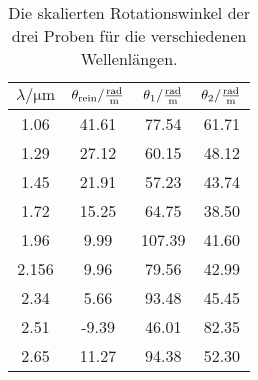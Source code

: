 \begin{table} \caption{Die skalierten Rotationswinkel der drei Proben für die verschiedenen Wellenlängen.}
    \label{tab:skaliert}
    \centering
    \begin{tabular}{cccc}
        \toprule
        {$\lambda / \si{\micro\meter}$} & {$\theta_\text{rein}/ \si[per-mode=fraction]{\radian\per\meter}$} & {$\theta_1/ \si[per-mode=fraction]{\radian\per\meter}$} & {$\theta_2/ \si[per-mode=fraction]{\radian\per\meter}$} \\
        \midrule
     1.06 &  41.61 &  77.54   &   61.71 \\
     1.29 &  27.12 &  60.15   &   48.12 \\
     1.45 &  21.91 &  57.23   &   43.74 \\
     1.72 &  15.25 &  64.75   &   38.50 \\
     1.96 &  9.99  &  107.39  &   41.60 \\
     2.156&  9.96  &  79.56   &   42.99 \\
     2.34 &  5.66  &  93.48   &   45.45 \\
     2.51 &  -9.39 &  46.01   &   82.35 \\
     2.65 &  11.27 &  94.38   &   52.30 \\
        
        \bottomrule
    \end{tabular}
\end{table}